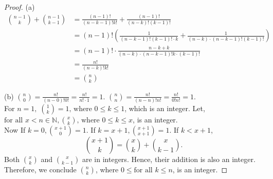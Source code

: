\documentclass[12pt]{article}
\begin{document}
\begin{proof}
	(a) \begin{align*}
		\binom{n -1}{k} + \binom{n - 1}{k - 1}
		 & = \frac{(n-1)!}{(n-k-1)!k!} + \frac{(n-1)!}{(n-k)!(k-1)!}                                     \\
		 & = (n-1)! \left( \frac{1}{(n-k-1)!(k-1)!\cdot k} + \frac{1}{(n-k)\cdot (n-k-1)!(k-1)!} \right) \\
		 & = (n-1)!\cdot \frac{n-k+k}{(n-k)\cdot (n-k-1)! k\cdot (k-1)!}                                 \\
		 & = \frac{n!}{(n-k)!k!}                                                                         \\
		 & = \binom{n}{k}
	\end{align*}

	(b) $\binom{n}{0} = \frac{n!}{(n-0)!0!} = \frac{n!}{n!\cdot 1} = 1$. $\binom{n}{n} = \frac{n!}{(n-n)!n!} = \frac{n!}{0!n!} = 1$.\\
	For $n = 1, \; \binom{1}{k} = 1 \text{, where } 0 \leq k \leq 1$, which is an integer. Let, $\text{for all } x < n \in \mathbb{N}, \binom{x}{k} \text{, where } 0 \leq k \leq x$, is an integer. \\
	Now If $k = 0, \binom{x + 1}{0} = 1$. If $k = x + 1, \binom{x + 1}{x + 1} = 1$.
	If $k < x + 1$,
	\[
		\binom{x + 1}{k} = \binom{x}{k} + \binom{x}{k - 1}.
	\]
	Both $\binom{x}{k}$ and $\binom{x}{k - 1}$ are in integers. Hence, their addition is also an integer. Therefore, we conclude $\binom{n}{k}$, where $0 \leq \text{for all } k \leq n$, is an integer.


\end{proof}
\end{document}
